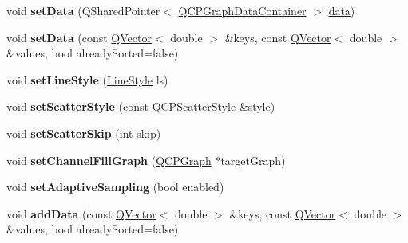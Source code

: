\begin{DoxyCompactItemize}
\item 
void {\bfseries set\+Data} (Q\+Shared\+Pointer$<$ \hyperlink{class_q_c_p_data_container}{Q\+C\+P\+Graph\+Data\+Container} $>$ \hyperlink{class_q_c_p_graph_a04514a2b1fb61a280ead66abe80b89ab}{data})\hypertarget{class_q_c_p_graph_a1eae9429a316b008e2d99b2d65a54395}{}\label{class_q_c_p_graph_a1eae9429a316b008e2d99b2d65a54395}

\item 
void {\bfseries set\+Data} (const \hyperlink{class_q_vector}{Q\+Vector}$<$ double $>$ \&keys, const \hyperlink{class_q_vector}{Q\+Vector}$<$ double $>$ \&values, bool already\+Sorted=false)\hypertarget{class_q_c_p_graph_a73578d786532132310a926c3cd529b29}{}\label{class_q_c_p_graph_a73578d786532132310a926c3cd529b29}

\item 
void {\bfseries set\+Line\+Style} (\hyperlink{class_q_c_p_graph_ad60175cd9b5cac937c5ee685c32c0859}{Line\+Style} ls)\hypertarget{class_q_c_p_graph_a513fecccff5b2a50ce53f665338c60ff}{}\label{class_q_c_p_graph_a513fecccff5b2a50ce53f665338c60ff}

\item 
void {\bfseries set\+Scatter\+Style} (const \hyperlink{class_q_c_p_scatter_style}{Q\+C\+P\+Scatter\+Style} \&style)\hypertarget{class_q_c_p_graph_a12bd17a8ba21983163ec5d8f42a9fea5}{}\label{class_q_c_p_graph_a12bd17a8ba21983163ec5d8f42a9fea5}

\item 
void {\bfseries set\+Scatter\+Skip} (int skip)\hypertarget{class_q_c_p_graph_a17cebd3196f434258abb82ba6dc443f2}{}\label{class_q_c_p_graph_a17cebd3196f434258abb82ba6dc443f2}

\item 
void {\bfseries set\+Channel\+Fill\+Graph} (\hyperlink{class_q_c_p_graph}{Q\+C\+P\+Graph} $\ast$target\+Graph)\hypertarget{class_q_c_p_graph_a2d03156df1b64037a2e36cfa50351ca3}{}\label{class_q_c_p_graph_a2d03156df1b64037a2e36cfa50351ca3}

\item 
void {\bfseries set\+Adaptive\+Sampling} (bool enabled)\hypertarget{class_q_c_p_graph_ab468cd600160f327836aa0644291e64c}{}\label{class_q_c_p_graph_ab468cd600160f327836aa0644291e64c}

\item 
void {\bfseries add\+Data} (const \hyperlink{class_q_vector}{Q\+Vector}$<$ double $>$ \&keys, const \hyperlink{class_q_vector}{Q\+Vector}$<$ double $>$ \&values, bool already\+Sorted=false)\hypertarget{class_q_c_p_graph_ae0555c0d3fe0fa7cb8628f88158d420f}{}\label{class_q_c_p_graph_ae0555c0d3fe0fa7cb8628f88158d420f}


\end{DoxyCompactItemize}
